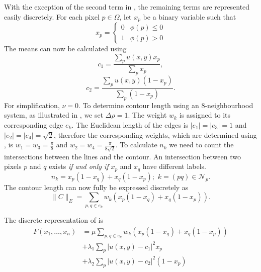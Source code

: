 \begin{definition}
	With the exception of the second term in , the remaining terms are represented easily discretely. For each pixel $p \in \Omega$, let $x_p$ be a binary variable such that
	\begin{equation}
		x_p = 
		\begin{cases} 
			0 & \phi(p)\leq 0 \\
			1 & \phi(p)> 0
		\end{cases}
	\end{equation}
	The means can now be calculated using 
	\begin{equation}
		c_1 = \frac{\sum_p u(x,y)x_p}{\sum_p x_p},
	\end{equation}
	\begin{equation}
		c_2 = \frac{\sum_p u(x,y)(1-x_p)}{\sum_p (1-x_p)}.
	\end{equation}
	For simplification, $\nu=0$. To determine contour length using an 8-neighbourhood system, as illustrated in , we set $\Delta\rho=1$. The weight $w_k$ is assigned to its corresponding edge $e_k$. The Euclidean length of the  edges is $|e_1|=|e_3| = 1$ and $|e_2|=|e_4|=\sqrt{2}$, therefore the corresponding weights, which are determined using , is $w_1 = w_3 = \frac{\pi}{8}$ and $w_2 = w_4 = \frac{\pi}{8\sqrt{2}}$. To calculate $n_k$ we need to count the intersections between the lines and the contour. An intersection between two pixels $p$ and $q$ exists \textit{if and only if} $x_p$ and $x_q$ have different labels.
	\begin{equation}
		n_{k} = x_p(1-x_q) + x_q(1-x_p) \text{; } \, k={(pq) \in \mathcal{N}_p}. 
	\end{equation}
	The contour length can now fully be expressed discretely as 
	\begin{equation}
		\lVert C \rVert_E = \sum_{p,q \in e_k} w_k( x_p(1-x_q) + x_q(1-x_p)).
	\end{equation}
	
	The discrete representation of  is
	\begin{equation}
		\begin{split}
			F(x_1, \ldots, x_n) & = \mu \sum_{p,q \in e_k} w_k( x_p(1-x_q) + x_q(1-x_p)) \\
			& + \lambda_1 \sum_p |u(x,y)-c_1|^2x_p \\
			& + \lambda_2 \sum_p |u(x,y)-c_2|^2(1-x_p)
		\end{split}
		\label{eq:discretemumfordshah}
	\end{equation}
\end{definition}

